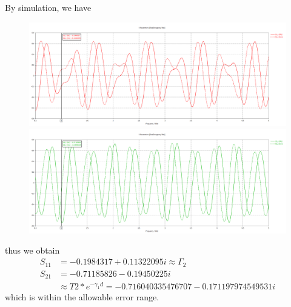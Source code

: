 \documentclass{article}
\begin{document}
By simulation, we have
\begin{figure}[h]
    \includegraphics[width=1\textwidth]{4.png}
    \includegraphics[width=1\textwidth]{5.png}
\end{figure}
thus we obtain
\begin{align*}
    S_{11} & = -0.1984317+0.11322095i \approx \Gamma_2\\
    S_{21} & = -0.71185826-0.19450225i\\
    &\approx T2*e^{-\gamma_1d} = -0.716040335476707 - 0.171197974549531i
\end{align*}
which is within the allowable error range.
\end{document}
